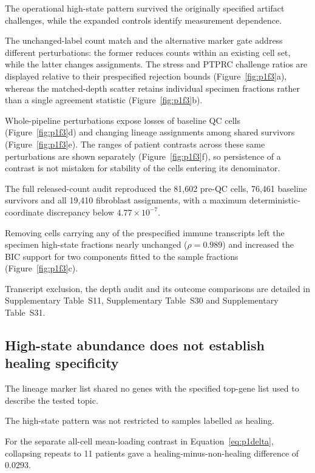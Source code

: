 \documentclass[10pt,a4paper]{article}
\begin{document}
The operational high-state pattern survived the originally specified artifact challenges, while the expanded controls identify measurement dependence.

The unchanged-label count match and the alternative marker gate address different perturbations: the former reduces counts within an existing cell set, while the latter changes assignments. \FloatBarrier
The stress and PTPRC challenge ratios are displayed relative to their prespecified rejection bounds (Figure~\ref{fig:p1f3}a\label{call:p1f3}), whereas the matched-depth scatter retains individual specimen fractions rather than a single agreement statistic (Figure~\ref{fig:p1f3}b).



Whole-pipeline perturbations expose losses of baseline QC cells (Figure~\ref{fig:p1f3}d) and changing lineage assignments among shared survivors (Figure~\ref{fig:p1f3}e). The ranges of patient contrasts across these same perturbations are shown separately (Figure~\ref{fig:p1f3}f), so persistence of a contrast is not mistaken for stability of the cells entering its denominator.

The full released-count audit reproduced the 81,602 pre-QC cells, 76,461 baseline survivors and all 19,410 fibroblast assignments, with a maximum deterministic-coordinate discrepancy below $4.77\times10^{-7}$.

Removing cells carrying any of the prespecified immune transcripts left the specimen high-state fractions nearly unchanged ($\rho=0.989$) and increased the BIC support for two components fitted to the sample fractions (Figure~\ref{fig:p1f3}c).

Transcript exclusion, the depth audit and its outcome comparisons are detailed in Supplementary Table~S11, Supplementary Table~S30 and Supplementary Table~S31.

\subsection{High-state abundance does not establish healing specificity}

The lineage marker list shared no genes with the specified top-gene list used to describe the tested topic.

The high-state pattern was not restricted to samples labelled as healing.

For the separate all-cell mean-loading contrast in Equation~\eqref{eq:p1delta}, collapsing repeats to 11 patients gave a healing-minus-non-healing difference of 0.0293.
\end{document}
